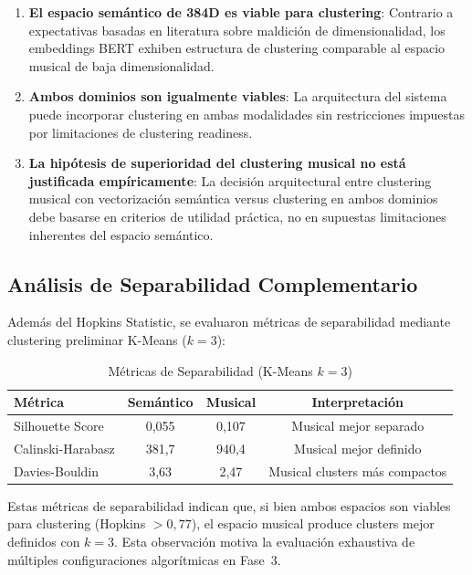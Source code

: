 \begin{enumerate}
    \item \textbf{El espacio semántico de 384D es viable para clustering}: Contrario a expectativas basadas en literatura sobre maldición de dimensionalidad, los embeddings BERT exhiben estructura de clustering comparable al espacio musical de baja dimensionalidad.

    \item \textbf{Ambos dominios son igualmente viables}: La arquitectura del sistema puede incorporar clustering en ambas modalidades sin restricciones impuestas por limitaciones de clustering readiness.

    \item \textbf{La hipótesis de superioridad del clustering musical no está justificada empíricamente}: La decisión arquitectural entre clustering musical con vectorización semántica versus clustering en ambos dominios debe basarse en criterios de utilidad práctica, no en supuestas limitaciones inherentes del espacio semántico.
\end{enumerate}

\subsection{Análisis de Separabilidad Complementario}
\label{subsec:separabilidad-complementario}

Además del Hopkins Statistic, se evaluaron métricas de separabilidad mediante clustering preliminar K-Means ($k=3$):

\begin{table}[htbp]
\centering
\caption{Métricas de Separabilidad (K-Means $k=3$)}
\label{tab:separabilidad-kmeans}
\begin{tabular}{lccc}
\toprule
\textbf{Métrica} & \textbf{Semántico} & \textbf{Musical} & \textbf{Interpretación} \\
\midrule
Silhouette Score & 0,055 & 0,107 & Musical mejor separado \\
Calinski-Harabasz & 381,7 & 940,4 & Musical mejor definido \\
Davies-Bouldin & 3,63 & 2,47 & Musical clusters más compactos \\
\bottomrule
\end{tabular}
\end{table}

Estas métricas de separabilidad indican que, si bien ambos espacios son viables para clustering (Hopkins $> 0{,}77$), el espacio musical produce clusters mejor definidos con $k=3$. Esta observación motiva la evaluación exhaustiva de múltiples configuraciones algorítmicas en Fase~3.

